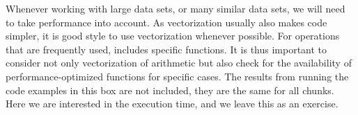 \documentclass[krantz2]{krantz}\usepackage{knitr}%
\begin{document}
\begin{explainbox}
Whenever working with large data sets, or many similar data sets, we will need to take performance into account. As vectorization usually also makes code simpler, it is good style to use vectorization whenever possible. For operations that are frequently used, \Rlang includes specific functions. It is thus important to consider not only vectorization of arithmetic but also check for the availability of performance-optimized functions for specific cases. The results from running the code examples in this box are not included, they are the same for all chunks. Here we are interested in the execution time, and we leave this as an exercise.

\begin{knitrout}\footnotesize
{}\color{fgcolor}\begin{kframe}
\begin{alltt}
 \hlkwb{<-} \hlstd{(}\hlopt{^}\hlstd{)} 
\end{alltt}
\end{kframe}
\end{knitrout}

\begin{knitrout}\footnotesize
{}\color{fgcolor}\begin{kframe}
\begin{alltt}
 \hlkwb{<-} \hlstd{(}\hlopt{-}\hlstd{)} 
 \hlkwb{<-} 
  \hlopt{<} 
   \hlkwb{<-} \hlopt{^}
   \hlkwb{<-}  \hlopt{+} 
\hlstd{\}}
\end{alltt}
\end{kframe}
\end{knitrout}

\begin{knitrout}\footnotesize
{}\color{fgcolor}\begin{kframe}
\begin{alltt}
 \hlkwb{<-} \hlstd{(}\hlopt{-}\hlstd{)} 
  \hlstd{(} 
   \hlkwb{<-} \hlstd{a[i}\hlopt{+}\hlstd{]} \hlopt{-} 
\hlstd{\}}
\end{alltt}
\end{kframe}
\end{knitrout}


\end{explainbox}
\end{document}
